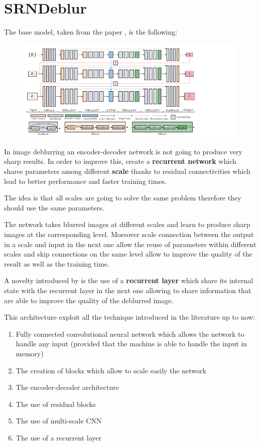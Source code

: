 \section{SRNDeblur}
The base model, taken from the paper \cite{SRN-DeblurNet},  is the following:
\begin{figure}[H]
    \centering
    \includegraphics[scale=0.5]{subsections/srndeblur/model.png}
\end{figure}

In image deblurring an encoder-decoder network is not going to produce very sharp  results. 
In order to  improve this, \cite{SRN-DeblurNet} create a \textbf{recurrent network} which shares parameters among different \textbf{scale} thanks to residual connectivities which lead to better performance and faster training times.

The idea is that all scales are going to solve the same problem therefore they should use the same parameters.

The network takes blurred images at different scales and learn to produce sharp images at the corresponding level.
Moreover scale connection between the output in a scale and input in the next one allow the reuse of parameters within different scales and skip connections on the same level allow to improve the quality of the result as well as the training time.

A novelty introduced by \cite{SRN-DeblurNet} is the use of a \textbf{recurrent layer} which share its internal state with the recurrent layer in the next one allowing to share information that are able to improve the quality of the deblurred image.

This architecture exploit all the technique introduced in the literature up to now:
\begin{enumerate}
    \item Fully connected convolutional neural network which allows the network to handle any input (provided that the machine is able to handle the input in memory)
    \item The creation of blocks which allow to scale easily the network
    \item The encoder-decoder architecture
    \item The use of residual blocks
    \item The use of multi-scale CNN
    \item The use of a recurrent layer
\end{enumerate}

